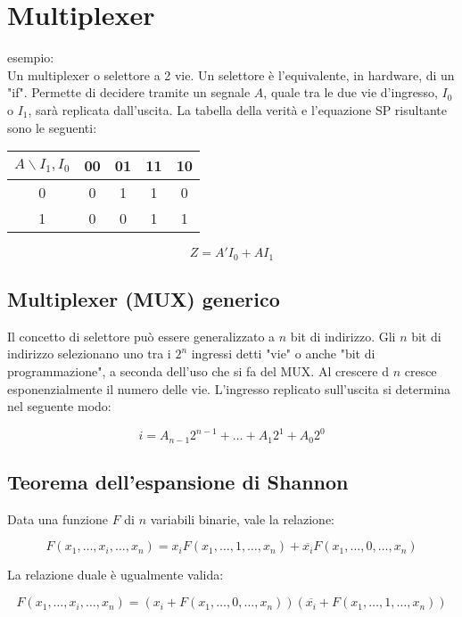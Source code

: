 \documentclass{article}
\begin{document}
\section{Multiplexer}

esempio:\\

\noindent
Un multiplexer o selettore a 2 vie.
Un selettore è l'equivalente, in hardware, di un "if".
Permette di decidere tramite un segnale $A$, quale tra le due vie d'ingresso, $I_0$ o $I_1$, sarà replicata dall'uscita.
La tabella della verità e l'equazione SP risultante sono le seguenti:

\begin{center}
\begin{tabular}{ |c|c|c|c|c| }
\hline
$A \backslash I_1,I_0$ & 00 & 01 & 11 & 10 \\
\hline
\hline
0 & 0 & 1 & 1 & 0 \\
1 & 0 & 0 & 1 & 1 \\
\hline
\end{tabular}
\end{center}

$$
Z = A'I_0 + A I_1
$$

\subsection{Multiplexer (MUX) generico}

Il concetto di selettore può essere generalizzato a $n$ bit di indirizzo.
Gli $n$ bit di indirizzo selezionano uno tra i $2^n$ ingressi detti "vie" o anche "bit di programmazione", a seconda dell'uso che si fa del MUX.
Al crescere d $n$ cresce esponenzialmente il numero delle vie.
L'ingresso replicato sull'uscita si determina nel seguente modo:

$$
i = A_{n-1} 2^{n-1} + \dots + A_1 2^1 + A_0 2^0
$$

\subsection{Teorema dell'espansione di Shannon}

Data una funzione $F$ di $n$ variabili binarie, vale la relazione:

$$
F(x_1, \dots, x_i, \dots, x_n) = x_i F(x_1, \dots, 1, \dots, x_n) + \overline{x_i} F(x_1, \dots, 0, \dots, x_n)
$$

\noindent
La relazione duale è ugualmente valida:

$$
F(x_1, \dots, x_i, \dots, x_n) = (x_i + F(x_1, \dots, 0, \dots, x_n))(\overline{x_i} + F(x_1, \dots, 1, \dots, x_n))
$$
\end{document}
